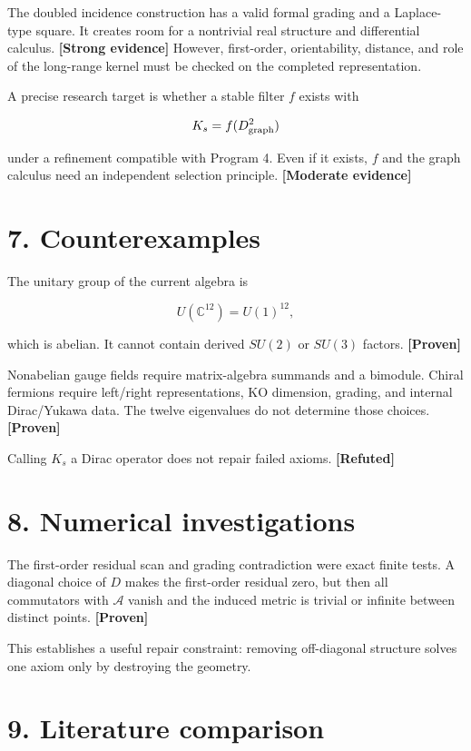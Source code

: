 \documentclass[11pt,a4paper,openany]{report}
\newcommand{\statusProven}{\textcolor{fingreen}{[Proven]}}
\newcommand{\statusStrong}{\textcolor{finblue}{[Strong evidence]}}
\newcommand{\statusModerate}{\textcolor{finviolet}{[Moderate evidence]}}
\newcommand{\statusRefuted}{\textcolor{finred}{[Refuted]}}
\begin{document}
The doubled incidence construction has a valid formal grading and a Laplace-type square. It creates room for a nontrivial real structure and differential calculus. \textbf{\statusStrong{}} However, first-order, orientability, distance, and role of the long-range kernel must be checked on the completed representation.

A precise research target is whether a stable filter \(f\) exists with

\[
K_s=f(D_{\rm graph}^2)
\]

under a refinement compatible with Program 4. Even if it exists, \(f\) and the graph calculus need an independent selection principle. \textbf{\statusModerate{}}

\section{7. Counterexamples}

The unitary group of the current algebra is

\[
U(\mathbb C^{12})=U(1)^{12},
\]

which is abelian. It cannot contain derived \(SU(2)\) or \(SU(3)\) factors. \textbf{\statusProven{}}

Nonabelian gauge fields require matrix-algebra summands and a bimodule. Chiral fermions require left/\allowbreak{}right representations, KO dimension, grading, and internal Dirac/\allowbreak{}Yukawa data. The twelve eigenvalues do not determine those choices. \textbf{\statusProven{}}

Calling \(K_s\) a Dirac operator does not repair failed axioms. \textbf{\statusRefuted{}}

\section{8. Numerical investigations}

The first-order residual scan and grading contradiction were exact finite tests. A diagonal choice of \(D\) makes the first-order residual zero, but then all commutators with \(\mathcal A\) vanish and the induced metric is trivial or infinite between distinct points. \textbf{\statusProven{}}

This establishes a useful repair constraint: removing off-diagonal structure solves one axiom only by destroying the geometry.

\section{9. Literature comparison}
\end{document}
